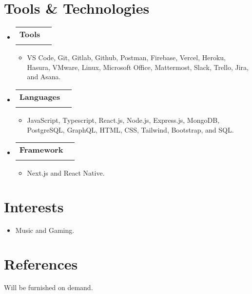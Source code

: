 \documentclass[letterpaper,11pt]{article}
\makeatletter
\newcommand{\resumeItem}[1]{
  \item\small{
    {#1 \vspace{-2pt}}
  }
}
\newcommand{\resumeSubheading}[4]{
  \vspace{-1pt}\item
    \begin{tabular*}{0.97\textwidth}[t]{l@{\extracolsep{\fill}}r}
      \textbf{#1} & #2 \\
      \textit{\small#3} & \textit{\small #4} \\
    \end{tabular*}\vspace{-6pt}
}
\newcommand{\resumeSubHeadingListStart}{\begin{itemize}[leftmargin=0.15in, label={}]}
\newcommand{\resumeSubHeadingListEnd}{\end{itemize}}
\newcommand{\resumeItemListStart}{\begin{itemize}}
\newcommand{\resumeItemListEnd}{\end{itemize}\vspace{-4pt}}
\makeatother
\begin{document}
\section{Tools \& Technologies}
  \resumeSubHeadingListStart
      \resumeSubheading
      {Tools}{}{}{}\vspace{-12pt}
      \resumeItemListStart
        \resumeItem{VS Code, Git, Gitlab, Github, Postman, Firebase, Vercel, Heroku, Hasura, VMware, Linux, Microsoft Office, Mattermost, Slack, Trello, Jira, and Asana.}
    \resumeItemListEnd
    \resumeSubheading
    {Languages}{}{}{}\vspace{-12pt}
      \resumeItemListStart
        \resumeItem{JavaScript, Typescript,  React.js, Node.js, Express.js,  MongoDB, PostgreSQL, GraphQL, HTML, CSS, Tailwind, Bootstrap, and SQL.}
    \resumeItemListEnd
    \resumeSubheading
    {Framework}{}{}{}\vspace{-12pt}
      \resumeItemListStart
        \resumeItem{Next.js and React Native.}
    \resumeItemListEnd
  \resumeSubHeadingListEnd


\section{Interests}
      \resumeItemListStart
        \resumeItem{Music and Gaming.}
    \resumeItemListEnd

\section{References}
    \begin{itemize}[leftmargin=0.15in, label={}]
    \small{\item{
     \textbf{}{Will be furnished on demand.} \\
    }}
 \end{itemize}
      



\end{document}
